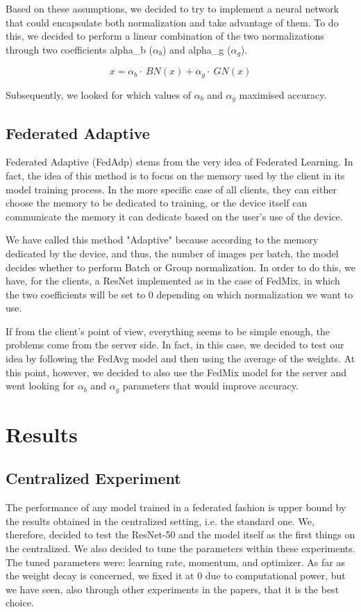 \documentclass[conference]{IEEEtran}
\begin{document}
Based on these assumptions, we decided to try to implement a neural network that could encapsulate both normalization and take advantage of them. To do this, we decided to perform a linear combination of the two normalizations through two coefficients alpha\_b ($\alpha_b$) and alpha\_g ($\alpha_g$). 

\begin{equation}
    x = \alpha_b \cdot~ BN(x) + \alpha_g \cdot~ GN(x)
\end{equation}

Subsequently, we looked for which values of $\alpha_b$ and $\alpha_g$ maximised accuracy.

\subsection{\textbf{Federated Adaptive}}

Federated Adaptive (FedAdp) stems from the very idea of Federated Learning. In fact, the idea of this method is to focus on the memory used by the client in its model training process. In the more specific case of all clients, they can either choose the memory to be dedicated to training, or the device itself can communicate the memory it can dedicate based on the user's use of the device. 

We have called this method "Adaptive" because according to the memory dedicated by the device, and thus, the number of images per batch, the model decides whether to perform Batch or Group normalization. In order to do this, we have, for the clients, a ResNet implemented as in the case of FedMix, in which the two coefficients will be set to 0 depending on which normalization we want to use.

If from the client's point of view, everything seems to be simple enough, the problems come from the server side. In fact, in this case, we decided to test our idea by following the FedAvg model and then using the average of the weights. At this point, however, we decided to also use the FedMix model for the server and went looking for $\alpha_b$ and $\alpha_g$ parameters that would improve accuracy.
\section{Results}
\subsection{Centralized Experiment}
The performance of any model trained in a federated fashion is upper bound by the results obtained in the centralized setting, i.e. the standard one. We, therefore, decided to test the ResNet-50 and the model itself as the first things on the centralized. We also decided to tune the parameters within these experiments. The tuned parameters were: learning rate, momentum, and optimizer. As far as the weight decay is concerned, we fixed it at 0 due to computational power, but we have seen, also through other experiments in the papers, that it is the best choice.
\end{document}
